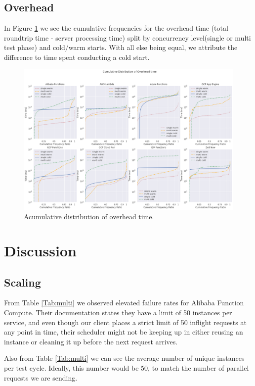 \documentclass[11pt]{article}
\begin{document}
\subsection{Overhead}

In Figure \ref{Fig:overhead} we see the cumulative frequencies for the overhead time
(total roundtrip time - server processing time) 
split by concurrency level(single or multi test phase) and cold/warm starts.
With all else being equal, we attribute the difference to time spent conducting a cold start.


\begin{figure}[h]
\includegraphics[width=14cm]{overhead.png}
\centering
\caption{Acumulative distribution of overhead time.}
\label{Fig:overhead}
\end{figure}


\section{Discussion}
\label{discussion}

\subsection{Scaling}
\label{subscaling}
From Table \ref{Tab:multi}
we observed elevated failure rates for Alibaba Function Compute.
Their documentation \cite{ali}
states they have a limit of 50 instances per service,
and even though our client places a strict limit of 50 inflight requests at any point in time,
their scheduler might not be keeping up
in either reusing an instance or cleaning it up before the next request arrives. 

Also from Table \ref{Tab:multi}
we can see the average number of unique instances per test cycle.
Ideally, this number would be 50,
to match the number of parallel requests we are sending. \\
\end{document}
